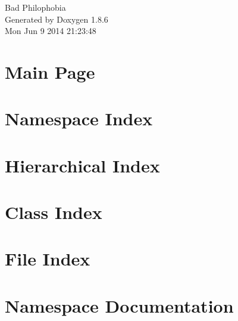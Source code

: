 \documentclass[twoside]{book}
\newcommand{\clearemptydoublepage}{%
  \newpage{\pagestyle{empty}\cleardoublepage}%
}
\begin{document}
\hypersetup{pageanchor=false}
\begin{titlepage}
\vspace*{7cm}
\begin{center}%
{\Large Bad Philophobia }\\
\vspace*{1cm}
{\large Generated by Doxygen 1.8.6}\\
\vspace*{0.5cm}
{\small Mon Jun 9 2014 21:23:48}\\
\end{center}
\end{titlepage}
\clearemptydoublepage
\tableofcontents
\clearemptydoublepage
{}
\hypersetup{pageanchor=true}

\chapter{Main Page}
\label{index}\hypertarget{index}{}
\chapter{Namespace Index}

\chapter{Hierarchical Index}

\chapter{Class Index}

\chapter{File Index}

\chapter{Namespace Documentation}









\end{document}
